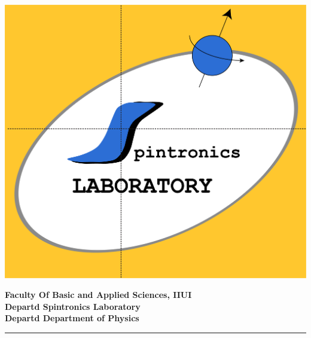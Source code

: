 \documentclass[12pt]{article}
\begin{document}
\vspace*{0.001cm}
\onehalfspacing
{}
\noindent
\begin{center}
\begin{minipage}{0.2\textwidth}
  \includegraphics[width=0.75\linewidth]{Spintronics logo}
\end{minipage}%
\hspace{8pt} %
\begin{minipage}{0.7\textwidth}
  \fontsize{17}{20}\selectfont
  \textcolor{iiu}{{\textbf{Faculty Of Basic and Applied Sciences, IIUI \\  \textcolor{fill}{Departd} \textbf{Spintronics Laboratory}  \\ \textcolor{fill}{Departd}  \textbf{Department of Physics}}}}
\end{minipage}
\end{center}
\begin{center}


\rule{0.9\linewidth}{1pt}
\end{center}
\end{document}
